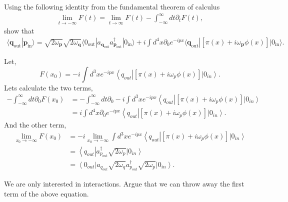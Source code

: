 \documentclass[working, oneside]{../../Preambles/tuftebook}
\begin{document}
\begin{exercise}[4]
Using the following identity from the fundamental theorem of calculus
\begin{align*}
\lim_{t \to -\infty} F(t) = \lim_{t \to \infty} F(t) - \int_{-\infty}^{\infty} dt \partial_t F(t), \tag{92}
\end{align*}
show that
\begin{align*}
\langle \mathbf{q}_{\text{out}} | \mathbf{p}_{\text{in}} \rangle = \sqrt{2 \omega_\mathbf{p}} \sqrt{2 \omega_\mathbf{q}} \langle 0_{\text{out}} | a_{\mathbf{q}_{\text{out}}} a_{\mathbf{p}_{\text{out}}}^\dagger | 0_{\text{in}} \rangle + i \int d^4x \partial_0 e^{-ipx} \langle \mathbf{q}_{\text{out}} | \left[ \pi(x) + i \omega_\mathbf{p} \phi(x) \right] | 0_{\text{in}} \rangle. \tag{93}
\end{align*}
\end{exercise}
Let,
\[
F\left( x_0 \right)  =  -i\int d^{3}x e^{-ipx}\left<q_{out} \right|\left[ \pi\left( x \right) + i\omega_p \phi \left( x \right) \right] \left|0_{in} \right> 
.\] 
Lets calculate the two terms,
\begin{align*}
    -\int_{-\infty}^{\infty} dt \partial_0 F\left( x_0 \right) &= -\int_{-\infty}^{\infty} dt \partial_0 -i\int d^{3}x e^{-ipx}\left<q_{out} \right|\left[ \pi\left( x \right) + i\omega_p \phi \left( x \right) \right] \left|0_{in} \right> \\
                                                               &=i\int d^{4}x \partial_0e^{-ipx}\left<q_{out} \right|\left[ \pi\left( x \right) + i\omega_p \phi \left( x \right) \right] \left|0_{in} \right>   
.\end{align*}
And the other term,
\begin{align*}
    \lim_{x_0 \to -\infty} F\left( x_0 \right) &= -i \lim_{x_0 \to -\infty} \int d^{3}x e^{-ipx}\left<q_{out} \right|\left[ \pi\left( x \right) + i\omega_p \phi \left( x \right) \right] \left|0_{in} \right>  \\
    &= \left<q_{out} \right| a_{p_{out}}^\dagger \sqrt{2\omega_p} \left|0_{in} \right> \\
    &= \left<0_{out} \right|a_{q_{out}}\sqrt{2\omega_{q}}  a_{p_{out}}^\dagger \sqrt{2\omega_p} \left|0_{in} \right> 
.\end{align*}
\begin{exercise}[5]
We are only interested in interactions. Argue that we can throw away the first term of the above equation.
\end{exercise}
\end{document}
